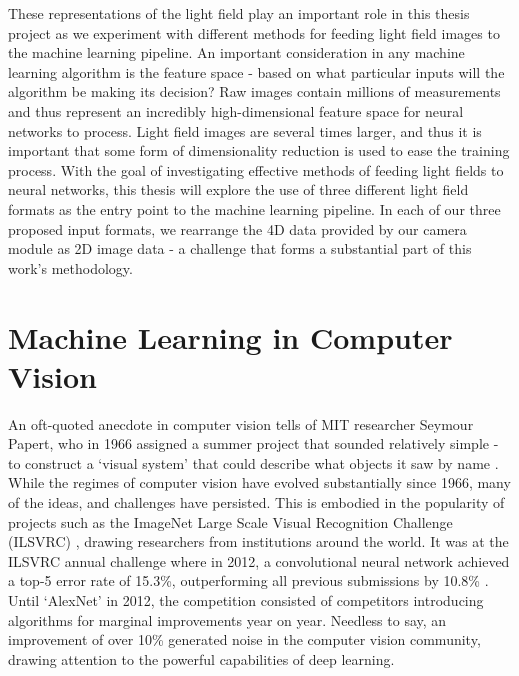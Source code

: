 These representations of the light field play an important role in this thesis project as we experiment with different methods for feeding light field images to the machine learning pipeline. An important consideration in any machine learning algorithm is the feature space - based on what particular inputs will the algorithm be making its decision? Raw images contain millions of measurements and thus represent an incredibly high-dimensional feature space for neural networks to process. Light field images are several times larger, and thus it is important that some form of dimensionality reduction is used to ease the training process. With the goal of investigating effective methods of feeding light fields to neural networks, this thesis will explore the use of three different light field formats as the entry point to the machine learning pipeline. In each of our three proposed input formats, we rearrange the 4D data provided by our camera module as 2D image data - a challenge that forms a substantial part of this work's methodology.

\section{Machine Learning in Computer Vision}


An oft-quoted anecdote in computer vision tells of MIT researcher Seymour Papert, who in 1966 assigned a summer project that sounded relatively simple - to construct a `visual system' that could describe what objects it saw by name \cite{papert1966vision}. While the regimes of computer vision have evolved substantially since 1966, many of the ideas, and challenges have persisted. This is embodied in the popularity of projects such as the ImageNet Large Scale Visual Recognition Challenge (ILSVRC) \cite{ilsvrc}, drawing researchers from institutions around the world. It was at the ILSVRC annual challenge where in 2012, a convolutional neural network achieved a top-5 error rate of 15.3\%, outperforming all previous submissions by 10.8\% \cite{krizhevsky2012alexnet}. Until `AlexNet' in 2012, the competition consisted of competitors introducing algorithms for marginal improvements year on year. Needless to say, an improvement of over 10\% generated noise in the computer vision community, drawing attention to the powerful capabilities of deep learning.

